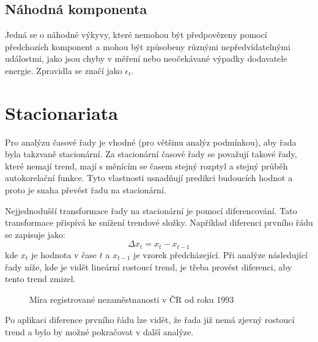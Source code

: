 \documentclass[FM,BP,fonts]{tulthesis}
\begin{document}
\subsection{Náhodná komponenta}
 Jedná se o náhodné výkyvy, které nemohou být předpovězeny pomocí předchozích komponent a mohou být způsobeny různými nepředvídatelnými událostmi, jako jsou chyby v měření nebo neočekávané výpadky dodavatele energie. Zpravidla se značí jako  $\epsilon_t$.
 

\section {Stacionariata}
Pro analýzu časové řady je vhodné (pro většinu analýz podmínkou), aby řada byla takzvaně stacionární. Za stacionární časové řady se považují takové řady, které nemají trend, mají s měnícím se časem stejný rozptyl a stejný průběh autokorelační funkce. Tyto vlastnosti usnadňují predikci budoucích hodnot a proto je snaha převést řadu na stacionární. 

Nejjednodušší transformace řady na stacionární je pomocí diferencování. Tato transformace přispívá ke snížení trendové složky. Například diferenci prvního řádu se zapisuje jako:  
\begin{equation}
 \Delta x_t = x_t - x_{t-1}
\end{equation}
kde $x_t$ je hodnota v čase $t$ a $x_{t-1}$ je vzorek předcházející. Při analýze následující řady níže, kde je vidět lineární rostoucí trend, je třeba provést diferenci, aby tento trend zmizel.
 
\begin{figure}[htbp]
	\centering
	\caption{Míra registrované nezaměstnanosti v ČR od roku 1993 }
	\label{fig:nezamestnanost}
\end{figure}

Po aplikaci diference prvního řádu lze vidět, že řada již nemá zjevný rostoucí trend a bylo by možné pokračovat v další analýze.
\end{document}
